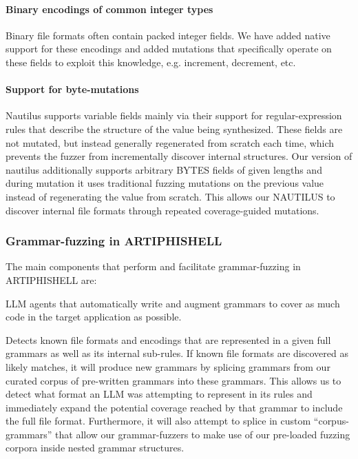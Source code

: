 \paragraph{Binary encodings of common integer types} Binary file formats often contain packed integer fields.
We have added native support for these encodings and added mutations that specifically operate on these fields to exploit this knowledge, e.g. increment, decrement, etc.

\paragraph{Support for byte-mutations} Nautilus supports variable fields mainly via their support for regular-expression rules that describe the structure of the value being synthesized.
These fields are not mutated, but instead generally regenerated from scratch each time, which prevents the fuzzer from incrementally discover internal structures.
Our version of nautilus additionally supports arbitrary BYTES fields of given lengths and during mutation it uses traditional fuzzing mutations on the previous value instead of regenerating the value from scratch.
This allows our NAUTILUS to discover internal file formats through repeated coverage-guided mutations.

\subsubsection{Grammar-fuzzing in ARTIPHISHELL}

The main components that perform and facilitate grammar-fuzzing in ARTIPHISHELL are:

 LLM agents that automatically write and augment grammars to cover as much code in the target application as possible.

 Detects known file formats and encodings that are represented in a given full grammars as well as its internal sub-rules.
If known file formats are discovered as likely matches, it will produce new grammars by splicing grammars from  our curated corpus of pre-written grammars into these grammars.
This allows us to detect what format an LLM was attempting to represent in its rules and immediately expand the potential coverage reached by that grammar to include the full file format.
Furthermore, it will also attempt to splice in custom ``corpus-grammars'' that allow our grammar-fuzzers to make use of our pre-loaded fuzzing corpora inside nested grammar structures.


